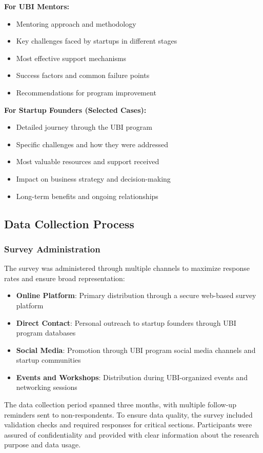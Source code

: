 \documentclass[../Main.tex]{subfiles}%
\begin{document}
	\textbf{For UBI Mentors:}
	\begin{itemize}
		\item Mentoring approach and methodology
		\item Key challenges faced by startups in different stages
		\item Most effective support mechanisms
		\item Success factors and common failure points
		\item Recommendations for program improvement
	\end{itemize}
	
	\textbf{For Startup Founders (Selected Cases):}
	\begin{itemize}
		\item Detailed journey through the UBI program
		\item Specific challenges and how they were addressed
		\item Most valuable resources and support received
		\item Impact on business strategy and decision-making
		\item Long-term benefits and ongoing relationships
	\end{itemize}
	
	\subsection{Data Collection Process}
	
	\subsubsection{Survey Administration}
	The survey was administered through multiple channels to maximize response rates and ensure broad representation:
	\begin{itemize}
		\item \textbf{Online Platform}: Primary distribution through a secure web-based survey platform
		\item \textbf{Direct Contact}: Personal outreach to startup founders through UBI program databases
		\item \textbf{Social Media}: Promotion through UBI program social media channels and startup communities
		\item \textbf{Events and Workshops}: Distribution during UBI-organized events and networking sessions
	\end{itemize}
	
	The data collection period spanned three months, with multiple follow-up reminders sent to non-respondents. To ensure data quality, the survey included validation checks and required responses for critical sections. Participants were assured of confidentiality and provided with clear information about the research purpose and data usage.
	
\end{document}

